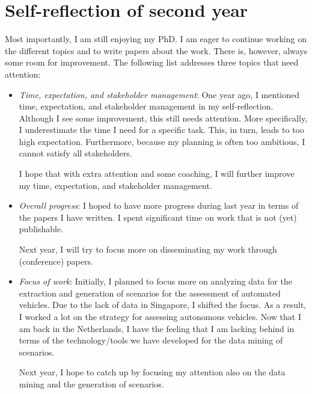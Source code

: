 \documentclass[10pt,final,a4paper,oneside,onecolumn]{article}
\begin{document}
\section{Self-reflection of second year}
\label{sec:evaluation}

Most importantly, I am still enjoying my PhD. I am eager to continue working on the different topics and to write papers about the work. There is, however, always some room for improvement. The following list addresses three topics that need attention:
\begin{itemize}
	\item \emph{Time, expectation, and stakeholder management}: One year ago, I mentioned time, expectation, and stakeholder management in my self-reflection. Although I see some improvement, this still needs attention. More specifically, I underestimate the time I need for a specific task. This, in turn, leads to too high expectation. Furthermore, because my planning is often too ambitious, I cannot satisfy all stakeholders. 
	
	I hope that with extra attention and some coaching, I will further improve my time, expectation, and stakeholder management.
	
	\item \emph{Overall progress}: I hoped to have more progress during last year in terms of the papers I have written. I spent significant time on work that is not (yet) publishable. 
	
	Next year, I will try to focus more on disseminating my work through (conference) papers. 
	
	\item \emph{Focus of work}: Initially, I planned to focus more on analyzing data for the extraction and generation of scenarios for the assessment of automated vehicles. Due to the lack of data in Singapore, I shifted the focus. As a result, I worked a lot on the strategy for assessing autonomous vehicles. Now that I am back in the Netherlands, I have the feeling that I am lacking behind in terms of the technology/tools we have developed for the data mining of scenarios. 
	
	Next year, I hope to catch up by focusing my attention also on the data mining and the generation of scenarios. 
\end{itemize}




\printbibliography

\clearpage

\end{document}
